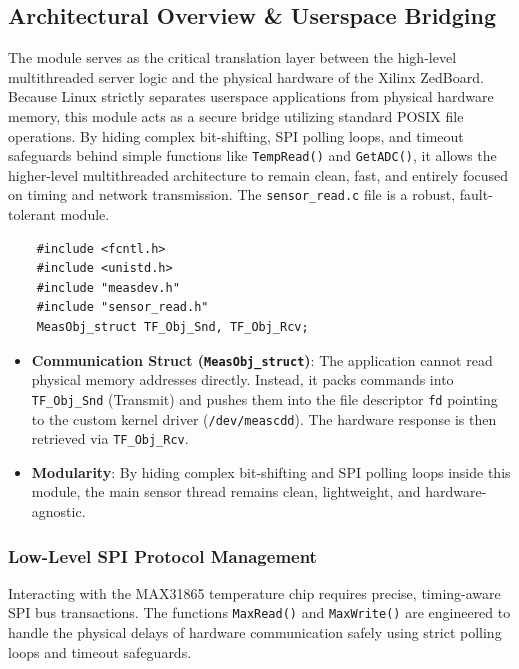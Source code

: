 


\subsection{Architectural Overview \& Userspace Bridging}
The module serves as the critical translation layer between the
high-level multithreaded server logic and the physical hardware of the
Xilinx ZedBoard. Because Linux strictly separates userspace applications
from physical hardware memory, this module acts as a secure bridge
utilizing standard POSIX file operations. By hiding complex
bit-shifting, SPI polling loops, and timeout safeguards behind simple
functions like \texttt{TempRead()} and \texttt{GetADC()}, it allows the
higher-level multithreaded architecture to remain clean, fast, and
entirely focused on timing and network transmission. The
\texttt{sensor\_read.c} file is a robust, fault-tolerant module.

\begin{verbatim}
    #include <fcntl.h>
    #include <unistd.h>
    #include "measdev.h"
    #include "sensor_read.h"
    MeasObj_struct TF_Obj_Snd, TF_Obj_Rcv;
\end{verbatim}


\begin{itemize}
    \item \textbf{Communication Struct (\texttt{MeasObj\_struct})}: The
          application cannot read physical memory addresses directly.
          Instead, it packs commands into \texttt{TF\_Obj\_Snd} (Transmit)
          and pushes them into the file descriptor \texttt{fd} pointing to
          the custom kernel driver (\texttt{/dev/meascdd}). The hardware
          response is then retrieved via \texttt{TF\_Obj\_Rcv}.

    \item \textbf{Modularity}: By hiding complex bit-shifting and SPI
          polling loops inside this module, the main sensor thread remains
          clean, lightweight, and hardware-agnostic.
\end{itemize}

\subsubsection{Low-Level SPI Protocol Management}
Interacting with the MAX31865 temperature chip requires precise,
timing-aware SPI bus transactions. The functions \texttt{MaxRead()} and
\texttt{MaxWrite()} are engineered to handle the physical delays of
hardware communication safely using strict polling loops and timeout
safeguards.

